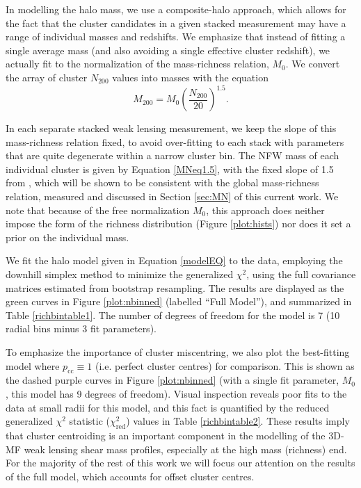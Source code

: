 In modelling the halo mass, we use a composite-halo approach, which allows for the fact that the cluster candidates in a given stacked measurement may have a range of individual masses and redshifts. We emphasize that instead of fitting a single average mass (and also avoiding a single effective cluster redshift), we actually fit to the normalization of the mass-richness relation, $M_0$. We convert the array of cluster $N_{200}$ values into masses with the equation
\begin{equation}
\label{MNeq1.5}
M_{200} = M_0 \left( \frac{N_{200}}{20} \right)^{1.5}.
\end{equation}

In each separate stacked weak lensing measurement, we keep the slope of this mass-richness relation fixed, to avoid over-fitting to each stack with parameters that are quite degenerate within a narrow cluster bin. The \ac{NFW} mass of each individual cluster is given by Equation \ref{MNeq1.5}, with the fixed slope of 1.5 from \citet{Ford14}, which will be shown to be consistent with the global mass-richness relation, measured and discussed in Section \ref{sec:MN} of this current work. We note that because of the free normalization $M_0$, this approach does neither impose the form of the richness distribution (Figure \ref{plot:hists}) nor does it set a prior on the individual mass.

We fit the halo model given in Equation \ref{modelEQ} to the data, employing the downhill simplex method to minimize the generalized $\chi^2$, using the full covariance matrices estimated from bootstrap resampling. The results are displayed as the green curves in Figure \ref{plot:nbinned} (labelled ``Full Model''), and summarized in Table \ref{richbintable1}. The number of degrees of freedom for the model is 7 (10 radial bins minus 3 fit parameters). 

To emphasize the importance of cluster miscentring, we also plot the best-fitting model where $p_{\mathrm{cc}} \equiv 1$ (i.e. perfect cluster centres) for comparison. This is shown as the dashed purple curves in Figure \ref{plot:nbinned} (with a single fit parameter, $M_0$, this model has 9 degrees of freedom). Visual inspection reveals poor fits to the data at small radii for this model, and this fact is quantified by the reduced generalized $\chi^2$ statistic ($\chi^2_{\mathrm{red}}$) values in Table \ref{richbintable2}. These results imply that cluster centroiding is an important component in the modelling of the \ac{3D-MF} weak lensing shear mass profiles, especially at the high mass (richness) end. For the majority of the rest of this work we will focus our attention on the results of the full model, which accounts for offset cluster centres.

